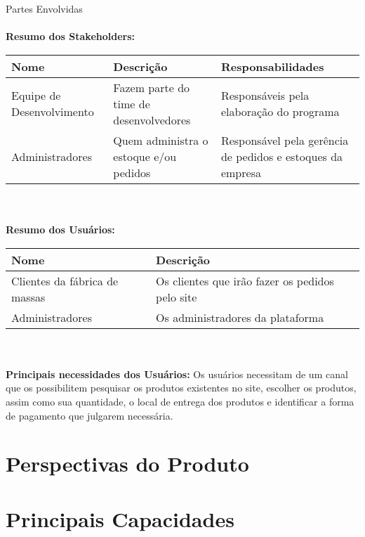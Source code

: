\begin{apendicesenv}
\begin{tabular}{|l|p{3in}|}
\end{tabular}

\large Partes Envolvidas \\
\tab \\
\textbf{Resumo dos Stakeholders:}  \\

\begin{tabular}{|p{1.5in}|p{1.5in}|p{1.5in}|}
  \hline
  \textbf{Nome} & \textbf{Descrição} & \textbf{Responsabilidades} \\ \hline
  Equipe de Desenvolvimento & Fazem parte do time de desenvolvedores & Responsáveis pela elaboração do programa \\ \hline
  Administradores & Quem administra o estoque e/ou pedidos & Responsável pela gerência de pedidos e estoques da empresa \\ \hline

\end{tabular} \\
\tab \\
\textbf{Resumo dos Usuários:}  \\

\begin{tabular}{|l|p{3in}|}
  \hline
  \textbf{Nome} & \textbf{Descrição} \\ \hline
  Clientes da fábrica de massas & Os clientes que irão fazer os pedidos pelo site \\ \hline
  Administradores & Os administradores da plataforma \\ \hline

\end{tabular}
\tab \\ \\
\textbf{Principais necessidades dos Usuários:} Os usuários necessitam de um canal que os possibilitem pesquisar os produtos existentes no site, escolher os produtos, assim como sua quantidade, o local de entrega dos produtos e identificar a forma de pagamento que julgarem necessária.   \\

{\large {\section { Perspectivas do Produto\\ } } }

{\large {\section { Principais Capacidades\\ } } }


\end{apendicesenv}
